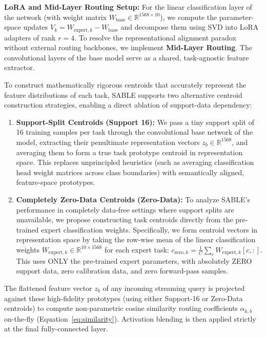 \textbf{LoRA and Mid-Layer Routing Setup:} For the linear classification layer of the network (with weight matrix $W_{\text{base}} \in \mathbb{R}^{1568 \times 10}$), we compute the parameter-space updates $V_k = W_{\text{expert}, k} - W_{\text{base}}$ and decompose them using SVD into LoRA adapters of rank $r=4$. To resolve the representational alignment paradox without external routing backbones, we implement \textbf{Mid-Layer Routing}. The convolutional layers of the base model serve as a shared, task-agnostic feature extractor. 

To construct mathematically rigorous centroids that accurately represent the feature distributions of each task, SABLE supports two alternative centroid construction strategies, enabling a direct ablation of support-data dependency:
\begin{enumerate}
    \item \textbf{Support-Split Centroids (Support 16):} We pass a tiny support split of 16 training samples per task through the convolutional base network of the model, extracting their penultimate representation vectors $z_b \in \mathbb{R}^{1568}$, and averaging them to form a true task prototype centroid in representation space. This replaces unprincipled heuristics (such as averaging classification head weight matrices across class boundaries) with semantically aligned, feature-space prototypes.
    \item \textbf{Completely Zero-Data Centroids (Zero-Data):} To analyze SABLE's performance in completely data-free settings where support splits are unavailable, we propose constructing task centroids directly from the pre-trained expert classification weights. Specifically, we form centroid vectors in representation space by taking the row-wise mean of the linear classification weights $W_{\text{expert}, k} \in \mathbb{R}^{10 \times 1568}$ for each expert task: $c_{\text{zero}, k} = \frac{1}{C}\sum_c W_{\text{expert}, k}[c, :]$. This uses ONLY the pre-trained expert parameters, with absolutely ZERO support data, zero calibration data, and zero forward-pass samples.
\end{enumerate}
The flattened feature vector $z_b$ of any incoming streaming query is projected against these high-fidelity prototypes (using either Support-16 or Zero-Data centroids) to compute non-parametric cosine similarity routing coefficients $\alpha_{k, b}$ on-the-fly (Equation~\ref{eq:similarity}). Activation blending is then applied strictly at the final fully-connected layer.

